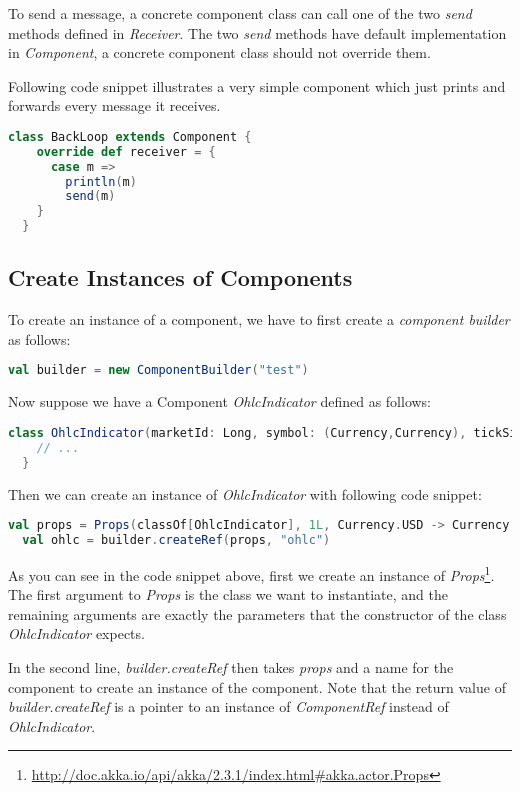 To send a message, a concrete component class can call one of the two \emph{send} methods defined in \emph{Receiver}. The two \emph{send} methods have default implementation in \emph{Component}, a concrete component class should not override them.

Following code snippet illustrates a very simple component which just prints and forwards every message it receives.

\begin{lstlisting}[language=Scala]
  class BackLoop extends Component {
    override def receiver = {
      case m =>
        println(m)
        send(m)
    }
  }
\end{lstlisting}

\subsection{Create Instances of Components}

To create an instance of a component, we have to first create a \emph{component builder} as follows:

\begin{lstlisting}[language=Scala]
val builder = new ComponentBuilder("test")
\end{lstlisting}

Now suppose we have a Component \emph{OhlcIndicator} defined as follows:

\begin{lstlisting}[language=Scala]
  class OhlcIndicator(marketId: Long, symbol: (Currency,Currency), tickSizeMillis: Long) extends Component   {
    // ...
  }
\end{lstlisting}

Then we can create an instance of \emph{OhlcIndicator} with following code snippet:

\begin{lstlisting}[language=Scala]
  val props = Props(classOf[OhlcIndicator], 1L, Currency.USD -> Currency.CHF, 50)
  val ohlc = builder.createRef(props, "ohlc")
\end{lstlisting}

As you can see in the code snippet above, first we create an instance of \emph{Props}\footnote{\url{http://doc.akka.io/api/akka/2.3.1/index.html\#akka.actor.Props}}. The first argument to \emph{Props} is the class we want to instantiate, and the remaining arguments are exactly the parameters that the constructor of the class \emph{OhlcIndicator} expects.

In the second line, \emph{builder.createRef} then takes \emph{props} and a name for the component to create an instance of the component. Note that the return value of \emph{builder.createRef} is a pointer to an instance of \emph{ComponentRef} instead of \emph{OhlcIndicator}.

